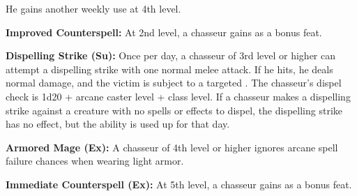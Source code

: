 {He gains another weekly use at 4th level.

\textbf{Improved Counterspell:} At 2nd level, a chasseur gains  as a bonus feat.

\textbf{Dispelling Strike (Su):} Once per day, a chasseur of 3rd level or higher can attempt a dispelling strike with one normal melee attack. If he hits, he deals normal damage, and the victim is subject to a targeted . The chasseur's dispel check is 1d20 + arcane caster level + class level. If a chasseur makes a dispelling strike against a creature with no spells or effects to dispel, the dispelling strike has no effect, but the ability is used up for that day.

\textbf{Armored Mage (Ex):} A chasseur of 4th level or higher ignores arcane spell failure chances when wearing light armor.

\textbf{Immediate Counterspell (Ex):} At 5th level, a chasseur gains  as a bonus feat.
}